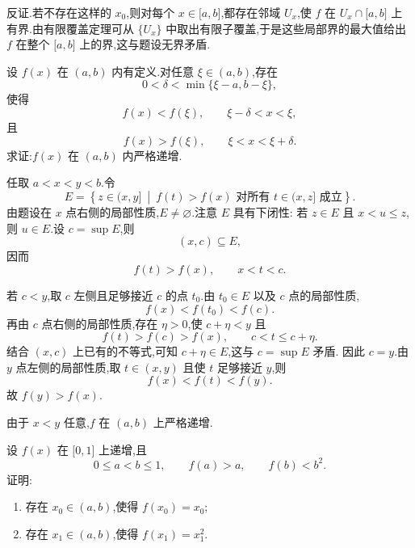 \begin{solution}
    反证.若不存在这样的 $x_0$,则对每个 $x\in\lbrack a,b\rbrack$,都存在邻域 $U_x$,使 $f$ 在 $U_x\cap\lbrack a,b\rbrack$ 上有界.由有限覆盖定理可从 $\{U_x\}$ 中取出有限子覆盖,于是这些局部界的最大值给出 $f$ 在整个 $\lbrack a,b\rbrack$ 上的界,这与题设无界矛盾.
\end{solution}

\begin{example}
    设 $f(x)$ 在 $(a,b)$ 内有定义.对任意 $\xi\in(a,b)$,存在
    \[
        0<\delta<\min\{\xi-a,b-\xi\},
    \]
    使得
    \[
        f(x)<f(\xi),
        \qquad
        \xi-\delta<x<\xi,
    \]
    且
    \[
        f(x)>f(\xi),
        \qquad
        \xi<x<\xi+\delta.
    \]
    求证:$f(x)$ 在 $(a,b)$ 内严格递增.
\end{example}
\exampleblank

\begin{solution}
    任取 $a<x<y<b$.令
    \[
        E=\left\{z\in(x,y]\ \middle|\
        f(t)>f(x)\text{ 对所有 }t\in(x,z]\text{ 成立}\right\}.
    \]
    由题设在 $x$ 点右侧的局部性质,$E\neq\varnothing$.注意 $E$ 具有下闭性:
    若 $z\in E$ 且 $x<u\leq z$,则 $u\in E$.设 $c=\sup E$,则
    \[
        (x,c)\subseteq E,
    \]
    因而
    \[
        f(t)>f(x),
        \qquad x<t<c.
    \]

    若 $c<y$,取 $c$ 左侧且足够接近 $c$ 的点 $t_0$.由 $t_0\in E$ 以及 $c$ 点的局部性质,
    \[
        f(x)<f(t_0)<f(c).
    \]
    再由 $c$ 点右侧的局部性质,存在 $\eta>0$,使 $c+\eta<y$ 且
    \[
        f(t)>f(c)>f(x),
        \qquad c<t\leq c+\eta.
    \]
    结合 $(x,c)$ 上已有的不等式,可知 $c+\eta\in E$,这与 $c=\sup E$ 矛盾.
    因此 $c=y$.由 $y$ 点左侧的局部性质,取 $t\in(x,y)$ 且使 $t$ 足够接近 $y$,则
    \[
        f(x)<f(t)<f(y).
    \]
    故 $f(y)>f(x)$.

    由于 $x<y$ 任意,$f$ 在 $(a,b)$ 上严格递增.
\end{solution}

\begin{example}
    设 $f(x)$ 在 $\lbrack0,1\rbrack$ 上递增,且
    \[
        0\leq a<b\leq1,
        \qquad
        f(a)>a,
        \qquad
        f(b)<b^2.
    \]
    证明:
    \begin{enumerate}
        \item 存在 $x_0\in(a,b)$,使得 $f(x_0)=x_0$;
        \item 存在 $x_1\in(a,b)$,使得 $f(x_1)=x_1^2$.
    \end{enumerate}
\end{example}
\exampleblank

